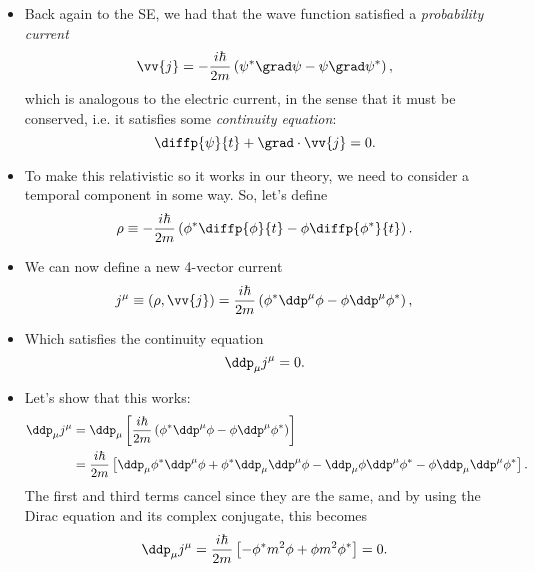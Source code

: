 \begin{itemize}
    \item Back again to the SE, we had that the wave function satisfied a \textit{probability current}
        \begin{equation}
            \vv{j} = -\frac{i\hbar}{2m} \left(\psi^* \grad\psi - \psi\grad\psi^*\right),
        \end{equation}
        which is analogous to the electric current, in the sense that it must be conserved, i.e. it satisfies some \textit{continuity equation}:
        \begin{equation}
            \diffp{\psi}{t} + \grad \cdot \vv{j} = 0.
        \end{equation}
    \item To make this relativistic so it works in our theory, we need to consider a temporal component in some way. So, let's define
        \begin{equation}
            \rho \equiv -\frac{i\hbar}{2m} \left(\phi^* \diffp{\phi}{t} - \phi\diffp{\phi^*}{t}\right).
        \end{equation}
    \item We can now define a new 4-vector current
        \begin{equation}
            j^{\mu} \equiv (\rho, \vv{j}) = \frac{i\hbar}{2m}\left(\phi^*\ddp^{\mu}\phi - \phi\ddp^{\mu}\phi^*\right),
        \end{equation}
    \item Which satisfies the continuity equation
        \begin{equation}
            \ddp_{\mu}j^{\mu} = 0.
        \end{equation}
    \item Let's show that this works:
        \begin{align}
            \ddp_{\mu}j^{\mu} &= \ddp_{\mu} \left[\frac{i\hbar}{2m}\left(\phi^*\ddp^{\mu}\phi - \phi\ddp^{\mu}\phi^*\right)\right] \\
            &= \frac{i\hbar}{2m} \left[\ddp_{\mu}\phi^*\ddp^{\mu}\phi + \phi^*\ddp_{\mu}\ddp^{\mu}\phi - \ddp_{\mu}\phi\ddp^{\mu}\phi^* - \phi\ddp_{\mu}\ddp^{\mu}\phi^*\right].
        \end{align}
        The first and third terms cancel since they are the same, and by using the Dirac equation and its complex conjugate, this becomes
        \begin{equation}
            \ddp_{\mu}j^{\mu} = \frac{i\hbar}{2m} \left[-\phi^* m^2 \phi + \phi m^2 \phi^*\right] = 0.
        \end{equation}
        
\end{itemize}